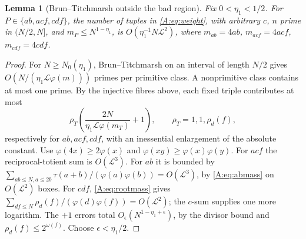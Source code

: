 \documentclass[10pt,reqno]{amsart}
\newtheorem{lemma}[theorem]{Lemma}
\theoremstyle{definition}
\numberwithin{equation}{section}
\newcommand{\cL}{\mathcal L}
\begin{document}
\begin{lemma}[Brun--Titchmarsh outside the bad region]\label{L:8.2}
Fix $0<\eta_1<1/2$. For $P\in\{ab,acf,cdf\}$, the number of tuples
in \eqref{A:eq:weight}, with arbitrary $c$, $n$ prime in $(N/2,N]$, and
$m_P\le N^{1-\eta_1}$, is $O(\eta_1^{-1}N\cL^2)$, where
$m_{ab}=4ab$, $m_{acf}=4acf$, $m_{cdf}=4cdf$.
\end{lemma}
\begin{proof}
For $N\ge N_0(\eta_1)$, Brun--Titchmarsh \cite{MV} on an interval of
length $N/2$ gives $O(N/(\eta_1\cL\varphi(m)))$ primes per primitive
class. A nonprimitive class contains at most one prime. By the injective
fibres above, each fixed triple contributes at most
\[
 \rho_T\left(\frac{2N}{\eta_1\cL\varphi(m_T)}+1\right),
 \qquad \rho_T=1,1,\rho_d(f),
\]
respectively for $ab,acf,cdf$, with an inessential enlargement of the
absolute constant. Use $\varphi(4x)\ge2\varphi(x)$ and
$\varphi(xy)\ge\varphi(x)\varphi(y)$.
For $acf$ the reciprocal-totient sum is $O(\cL^3)$.
For $ab$ it is bounded by
$\sum_{ab\le N,a\le2b}\tau(a+b)/(\varphi(a)\varphi(b))=O(\cL^3)$,
by \eqref{A:eq:abmass} on $O(\cL^2)$ boxes.
For $cdf$, \eqref{A:eq:rootmass} gives
$\sum_{df\le N}\rho_d(f)/(\varphi(d)\varphi(f))=O(\cL^2)$;
the $c$-sum supplies one more logarithm.
The $+1$ errors total $O_\epsilon(N^{1-\eta_1+\epsilon})$, by the divisor
bound and $\rho_d(f)\le2^{\omega(f)}$. Choose $\epsilon<\eta_1/2$.
\end{proof}
\end{document}
